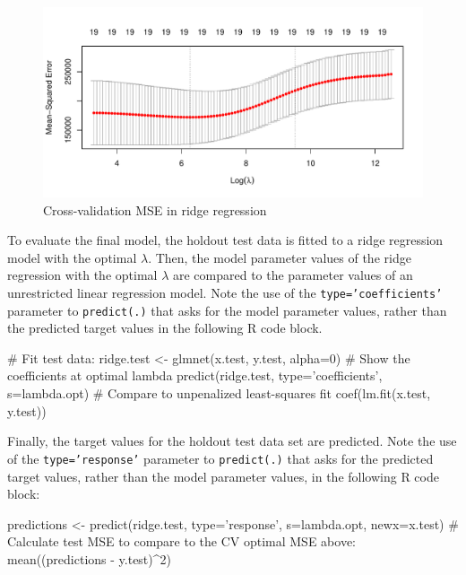 \begin{samepage}
\end{samepage}

\begin{figure}
\centering

\includegraphics[width=.9\textwidth]{crossvalidated_ridge.pdf}
\caption{Cross-validation MSE in ridge regression}
\label{fig:glmnetcv}
\end{figure}

To evaluate the final model, the holdout test data is fitted to a ridge regression model with the optimal $\lambda$. Then, the model parameter values of the ridge regression with the optimal $\lambda$ are compared to the parameter values of an unrestricted linear regression model. Note the use of the \texttt{type='coefficients'} parameter to \texttt{predict(.)} that asks for the model parameter values, rather than the predicted target values in the following R code block.

\begin{samepage}
\begin{Rcode}
# Fit test data:
ridge.test <- glmnet(x.test, y.test, alpha=0)
# Show the coefficients at optimal lambda
predict(ridge.test, type='coefficients', s=lambda.opt)
# Compare to unpenalized least-squares fit
coef(lm.fit(x.test, y.test))
\end{Rcode}
\end{samepage}

Finally, the target values for the holdout test data set are predicted. Note the use of the \texttt{type='response'} parameter to \texttt{predict(.)} that asks for the predicted target values, rather than the model parameter values, in the following R code block:

\begin{samepage}
\begin{Rcode}
predictions <- predict(ridge.test, type='response', 
                       s=lambda.opt, newx=x.test)
# Calculate test MSE to compare to the CV optimal MSE above:
mean((predictions - y.test)^2)
\end{Rcode}
\end{samepage}

